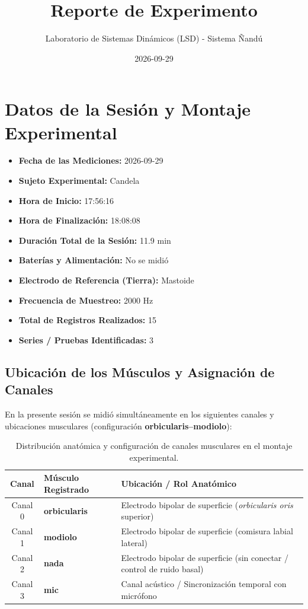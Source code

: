 \documentclass[11pt,a4paper]{article}
\title{\textbf{Reporte de Experimento}}
\author{Laboratorio de Sistemas Dinámicos (LSD) - Sistema Ñandú}
\date{2026-09-29}
\begin{document}
\maketitle

\section{Datos de la Sesión y Montaje Experimental}
\begin{itemize}
    \item \textbf{Fecha de las Mediciones:} 2026-09-29
    \item \textbf{Sujeto Experimental:} Candela
    \item \textbf{Hora de Inicio:} 17:56:16
    \item \textbf{Hora de Finalización:} 18:08:08
    \item \textbf{Duración Total de la Sesión:} 11.9 min
    \item \textbf{Baterías y Alimentación:} No se midió
    \item \textbf{Electrodo de Referencia (Tierra):} Mastoide
    \item \textbf{Frecuencia de Muestreo:} 2000 Hz
    \item \textbf{Total de Registros Realizados:} 15
    \item \textbf{Series / Pruebas Identificadas:} 3
\end{itemize}

\subsection{Ubicación de los Músculos y Asignación de Canales}
En la presente sesión se midió simultáneamente en los siguientes canales y ubicaciones musculares (configuración \textbf{orbicularis--modiolo}):
\begin{table}[H]
\centering
\begin{tabularx}{\textwidth}{c p{6.5cm} X}
\toprule
\textbf{Canal} & \textbf{Músculo Registrado} & \textbf{Ubicación / Rol Anatómico} \\
\midrule
Canal 0 & \textbf{orbicularis} & Electrodo bipolar de superficie (\textit{orbicularis oris} superior) \\
Canal 1 & \textbf{modiolo} & Electrodo bipolar de superficie (comisura labial lateral) \\
Canal 2 & \textbf{nada} & Electrodo bipolar de superficie (sin conectar / control de ruido basal) \\
Canal 3 & \textbf{mic} & Canal acústico / Sincronización temporal con micrófono \\
\bottomrule
\end{tabularx}
\caption{Distribución anatómica y configuración de canales musculares en el montaje experimental.}
\end{table}
\end{document}
